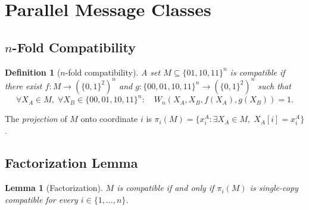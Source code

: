 \documentclass[11pt,letterpaper]{article}
\newtheorem{lemma}[theorem]{Lemma}
\newtheorem{definition}[theorem]{Definition}
\begin{document}
\section{Parallel Message Classes}
\label{sec:parallel}

\subsection{$n$-Fold Compatibility}

\begin{definition}[$n$-fold compatibility]
\label{def:ncompat}
A set $M \subseteq \{01,10,11\}^n$ is \emph{compatible} if there exist $f : M \to (\{0,1\}^2)^n$ and $g : \{00,01,10,11\}^n \to (\{0,1\}^2)^n$ such that
\[
  \forall X_A \in M,\; \forall X_B \in \{00,01,10,11\}^n:\quad W_n(X_A, X_B, f(X_A), g(X_B)) = 1.
\]
\end{definition}

The \emph{projection} of $M$ onto coordinate $i$ is $\pi_i(M) = \{x_i^A : \exists X_A \in M,\; X_A[i] = x_i^A\}$.

\subsection{Factorization Lemma}

\begin{lemma}[Factorization]
\label{lem:factor}
$M$ is compatible if and only if $\pi_i(M)$ is single-copy compatible for every $i \in \{1,\ldots,n\}$.
\end{lemma}
\end{document}
